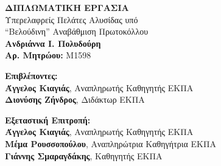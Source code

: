 \begin{center}
\begin{footnotesize}
    \vspace{3cm}
    \textbf{ΔΙΠΛΩΜΑΤΙΚH ΕΡΓΑΣIΑ}\\
    \vspace{3cm}
    Υπερελαφρείς Πελάτες Αλυσίδας υπό \\
    ``Βελούδινη'' Αναβάθμιση Πρωτοκόλλου\\
    \vspace{3cm}
    \textbf{Ανδριάννα I. Πολυδούρη}\\
    \textbf{Αρ. Μητρώου:} M1598
 
    \begin{flushleft}
        \textbf{Επιβλέποντες:}\\ 
        \hspace{2cm}
        \textbf{Άγγελος Κιαγιάς}, Αναπληρωτής Καθηγητής ΕΚΠΑ\\
        \hspace{2cm}
        \textbf{Διονύσης Ζήνδρος}, Διδάκτωρ ΕΚΠΑ

        \textbf{Εξεταστική Επιτροπή:}\\ 
        \hspace{2cm}
        \textbf{Άγγελος Κιαγιάς}, Αναπληρωτής Καθηγητής ΕΚΠΑ\\
        \hspace{2cm}
        \textbf{Μέμα Ρουσσοπούλου}, Αναπληρώτρια Καθηγήτρια ΕΚΠΑ\\
        \hspace{2cm}
        \textbf{Γιάννης Σμαραγδάκης}, Καθηγητής ΕΚΠΑ

    \end{flushleft}

\end{footnotesize}
\end{center}


\pagebreak